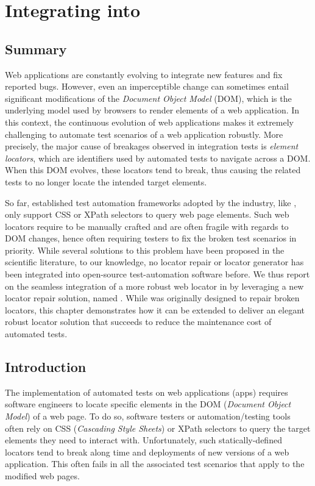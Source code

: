 \chapter{Integrating \erratum{} into \cerberus{}}\label{chap:cerberus}

\section*{Summary}
Web applications are constantly evolving to integrate new features and fix reported bugs.
However, even an imperceptible change can sometimes entail significant modifications of the \emph{Document Object Model} (DOM), which is the underlying model used by browsers to render elements of a web application.
In this context, the continuous evolution of web applications makes it extremely challenging to automate test scenarios of a web application robustly.
More precisely, the major cause of breakages observed in integration tests is \emph{element locators}, which are identifiers used by automated tests to navigate across a DOM.
When this DOM evolves, these locators tend to break, thus causing the related tests to no longer locate the intended target elements.

So far, established test automation frameworks adopted by the industry, like \cerberus{}, only support CSS or XPath selectors to query web page elements.
Such web locators require to be manually crafted and are often fragile with regards to DOM changes, hence often requiring testers to fix the broken test scenarios in priority. 
While several solutions to this problem have been proposed in the scientific literature, to our knowledge, no locator repair or locator generator has been integrated into open-source test-automation software before.
We thus report on the seamless integration of a more robust web locator in \cerberus{} by leveraging a new locator repair solution, named \erratum{}. While \erratum was originally designed to repair broken locators, this chapter demonstrates how it can be extended to deliver an elegant robust locator solution that succeeds to reduce the maintenance cost of automated tests.

\section{Introduction}
The implementation of automated tests on web applications (apps) requires software engineers to locate specific elements in the DOM (\emph{Document Object Model}) of a web page.
To do so, software testers or automation/testing tools often rely on CSS (\emph{Cascading Style Sheets}) or XPath selectors to query the target elements they need to interact with.
Unfortunately, such statically-defined locators tend to break along time and deployments of new versions of a web application.
This often fails in all the associated test scenarios that apply to the modified web pages.

